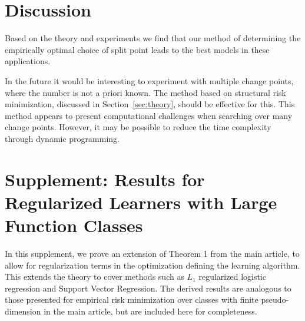 \documentclass{article}
\begin{document}
\section{Discussion}
Based on the theory and experiments we find that our method 
of determining the empirically optimal choice of split point 
leads to the best models in these applications.

In the future it would be interesting to experiment with multiple
change points, where the number is not a priori known. The
method based on structural risk minimization, discussed in Section~\ref{sec:theory}, should be effective for this.  This method appears to present computational
challenges when searching over many change points.  However, 
it may be possible to reduce the time complexity through dynamic
programming.



\section{Supplement: Results for Regularized Learners with Large Function Classes}
\label{sec:regularization}

In this supplement, we prove an extension of Theorem 1 from the main article,
to allow for regularization terms in the optimization defining the learning algorithm.
This extends the theory to cover methods such as $L_1$ regularized logistic regression
and Support Vector Regression.  The derived results are analogous to those presented
for empirical risk minimization over classes with finite pseudo-dimension in the main 
article, but are included here for completeness.
\end{document}
